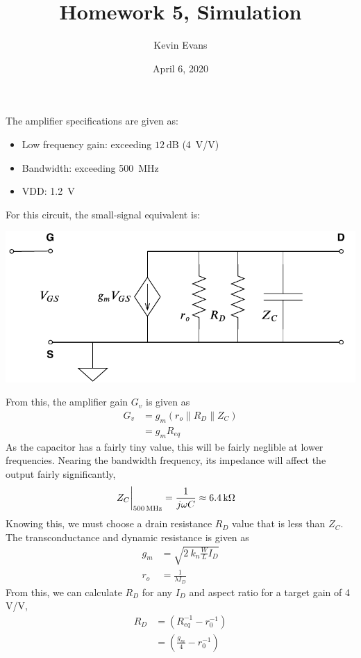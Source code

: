 \documentclass{homework}
\title{Homework 5, Simulation}
\author{Kevin Evans}
\date{April 6, 2020}
\begin{document}
	\maketitle
	The amplifier specifications are given as: \begin{itemize}
		\item Low frequency gain: exceeding $\SI{12}{\dB}$ (\SI{4}{\V/\V})
		\item Bandwidth: exceeding \SI{500}{\MHz}
		\item VDD: \SI{1.2}{\V}
	\end{itemize}
	For this circuit, the small-signal equivalent is:
	\begin{center}
		\includegraphics[width=0.7\linewidth]{acckt}
	\end{center}
	From this, the amplifier gain $G_v$ is given as \begin{align*}
		G_v & = g_m \left( r_o \parallel R_D \parallel Z_C \right) \\
			& = g_m R_{eq}
	\end{align*}
	As the capacitor has a fairly tiny value, this will be fairly neglible at lower frequencies. Nearing the bandwidth frequency, its impedance will affect the output fairly significantly, \begin{align*}
		\eval{ Z_C }_{\SI{500}{\MHz}} & = \frac{1}{j \omega C} \approx \SI{6.4}{\kohm}
	\end{align*}
	Knowing this, we must choose a drain resistance $R_D$ value that is less than $Z_C$. The transconductance and dynamic resistance is given as \begin{align*}
		g_m & = \sqrt{2 \: k_n \frac{W}{L} I_D } \\
		r_o & = \frac{1}{\lambda I_D}
	\end{align*}
	From this, we can calculate $R_D$ for any $I_D$ and aspect ratio for a target gain of 4 V/V, \begin{align*}
		R_D & = \left( R_{eq}^{-1} - r_0^{-1} \right) \\
			& = \left( \frac{g_m}{4} - r_0^{-1} \right)
	\end{align*}
	
\end{document}
